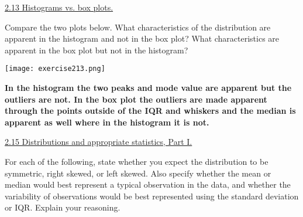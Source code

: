 \documentclass[10pt,letterpaper,unboxed,cm]{exam}
\begin{document}
\begin{questions}



	\question \underline{2.13 Histograms vs. box plots.}

    Compare the two plots below. What characteristics of the distribution are apparent in the histogram and not in the box plot? What characteristics are apparent in the box plot but not in the histogram?

    \texttt{[image: exercise213.png]}

    \bigskip
    {\bf In the histogram the two peaks and mode value are apparent but the outliers are not. In the box plot the outliers are made apparent through the points outside of the IQR and whiskers and the median is apparent as well where in the histogram it is not.} 
    \bigskip



	\question \underline{2.15 Distributions and appropriate statistics, Part I.}

    For each of the following, state whether you expect the distribution to be symmetric, right skewed, or left skewed. Also specify whether the mean or median would best represent a typical observation in the data, and whether the variability of observations would be best represented using the standard deviation or IQR. Explain your reasoning.
    

\end{questions}
\end{document}
